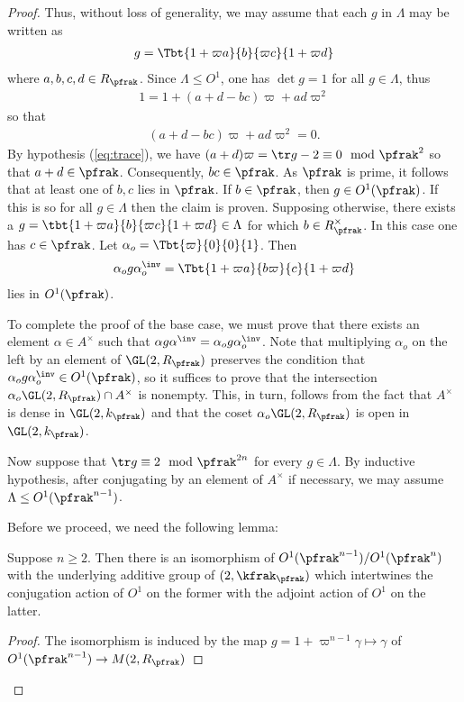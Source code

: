 \begin{proof}
    Thus, without loss of generality, we may assume that each $g$ in $\Lambda$ may be written as
    \begin{align*}
        g = \Tbt{1+\varpi a}{b}{\varpi c}{1+\varpi d}
    \end{align*}
    where $a,b,c,d \in R_\pfrak$.
    Since $\Lambda \leq O^1$, one has $\det g = 1 $ for all $g\in \Lambda$, thus
    \begin{align*}
        1 = 1 + (a+d - bc) \varpi + ad \varpi^2
    \end{align*}
    so that
    \begin{align}\label{eq:MandarinLeyden}
        (a+d - bc) \varpi + ad \varpi^2 =0.
    \end{align}
    By hypothesis (\ref{eq:trace}), we have $(a+d)\varpi = \tr g -2 \equiv 0 \mod \pfrak^2$ so that $a+d \in \pfrak$. Consequently, $bc \in \pfrak$. As $\pfrak$ is prime, it follows that at least one of $b,c$ lies in $\pfrak$. If $b \in \pfrak$, then $g \in O^1(\pfrak)$. If this is so for all $g \in \Lambda$ then the claim is proven. Supposing otherwise, there exists a $g=\tbt{1+\varpi a}{b}{\varpi c}{1+\varpi d} \in \Lambda$ for which $b \in R_\pfrak^\times$. In this case one has $c \in \pfrak$. Let $\alpha_o = \Tbt{\varpi}{0}{0}{1}$. Then
    \begin{align*}
        \alpha_o g\alpha_o^\inv  = \Tbt{1+\varpi a}{b\varpi}{c}{1+\varpi d}
    \end{align*}
    lies in $O^1(\pfrak)$.

    To complete the proof of the base case, we must prove that there exists an element $\alpha \in A^\times $ such that $\alpha g \alpha^\inv =  \alpha_o g \alpha_o^\inv$. Note that multiplying $\alpha_o$ on the left by an element of $\GL(2,R_\pfrak)$ preserves the condition that $\alpha_o g \alpha_o^\inv \in O^1(\pfrak)$, so it suffices to prove that the intersection $\alpha_o \GL(2,R_\pfrak) \cap A^\times $ is nonempty. This, in turn, follows from the fact that $A^\times$ is dense in $\GL(2,k_\pfrak)$ and that the coset  $\alpha_o \GL(2,R_\pfrak)$ is open in $\GL(2,k_\pfrak)$.

    Now suppose that $\tr g \equiv 2 \mod \pfrak^{2n}$ for every $g\in \Lambda$. By inductive hypothesis, after conjugating by an element of $A^\times$ if necessary, we may assume $\Lambda \leq O^1(\pfrak^{n-1})$.

    Before we proceed, we need the following lemma:
    \begin{lemma}
        Suppose $n\geq 2$. Then there is an isomorphism of $O^1(\pfrak^{n-1}) / O^1(\pfrak^{n})$ with the underlying additive group of $\sl(2,\kfrak_\pfrak)$ which intertwines the conjugation action of $O^1$ on the former with the adjoint action of $O^1$ on the latter.
    \end{lemma}
    \begin{proof}
        The isomorphism is induced by the map $g = 1 + \varpi^{n-1}\gamma \mapsto \gamma$  of $O^1(\pfrak^{n-1}) \to M(2,R_\pfrak)$
    \end{proof}


\end{proof}
